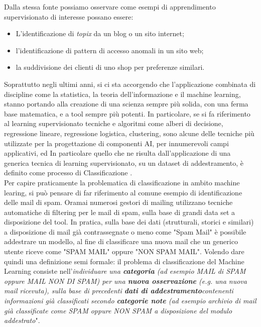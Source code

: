 Dalla stessa fonte possiamo osservare come esempi di apprendimento supervisionato di interesse possano essere:
\begin{itemize}
    \item L'identificazione di \textit{topix} da un blog o un sito internet;
    \item l'identificazione di pattern di accesso anomali in un sito web;
    \item la suddivisione dei clienti di uno shop per preferenze similari.
\end{itemize}

\begin{comment}
\begin{figure}[htpb]
    \centering
    \texttt{[image: supervisedML]}
    \caption{
        Processo standard di un algoritmo di Machine Learning Supervisionato dall'articolo \cite{supervisedML&Classification}
    }
    \label{fig:basics AFM sketch}
\end{figure}%
\end{comment}

Soprattutto negli ultimi anni, si ci sta accorgendo che l'applicazione combinata di discipline come la statistica, la teoria dell'informazione e il machine learning, stanno portando alla creazione di una scienza sempre più solida, con una ferma base matematica, e a tool sempre più potenti. In particolare, se si fa riferimento al learning supervisionato tecniche e algoritmi come alberi di decisione, regressione lineare, regressione logistica, clustering, sono alcune delle tecniche più utilizzate per la progettazione di componenti AI, per innumerevoli campi applicativi, ed In particolare quello che ne risulta dall'applicazione di una generica tecnica di learning supervisionato, su un dataset di addestramento, è definito come processo di Classificazione \cite{supervisedML&Classification}. \\

Per capire praticamente la problematica di classificazione in ambito machine learing, si può pensare di far riferimento al comune esempio di identificazione delle mail di spam. Oramai numerosi gestori di mailing utilizzano tecniche automatiche di filtering per le mail di spam, sulla base di grandi data set a disposizione del tool. In pratica, sulla base dei dati (strutturali, storici e similari) a disposizione di mail già contrassegnate o meno come "Spam Mail" è possibile addestrare un modello, al fine di classificare una nuova mail che un generico utente riceve come "SPAM MAIL" oppure "NON SPAM MAIL". Volendo dare quindi una definizione semi formale: il problema di classificazione del Machine Learning consiste nell'\textit{individuare una \textbf{categoria} (ad esempio MAIL di SPAM oppure MAIL NON DI SPAM) per una \textbf{nuova osservazione} (e.g. una nuova mail ricevuta), sulla base di precedenti \textbf{dati di addestramento}contenenti informazioni già classificati secondo \textbf{categorie note} (ad esempio archivio di mail già classificate come SPAM oppure NON SPAM a disposizione del modulo addestrato}"\cite{FairnessDefinitionExplained}.\\

